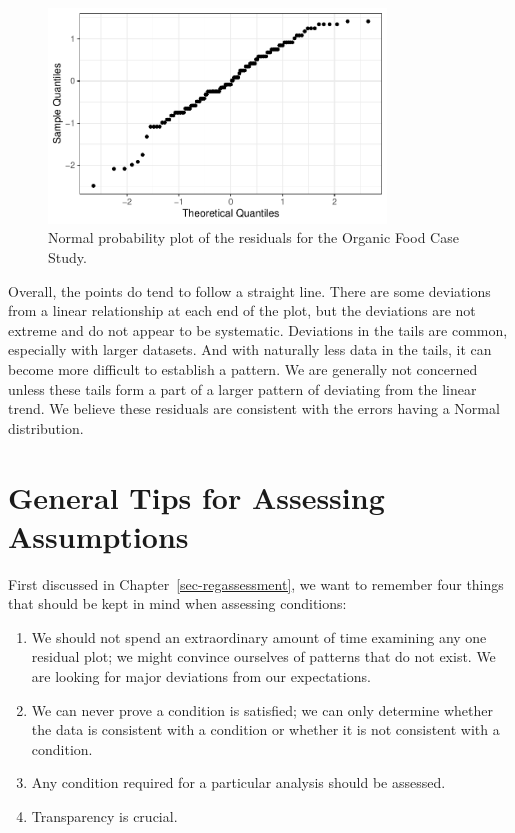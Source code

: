 \documentclass[
  letterpaper,
  DIV=11,
  numbers=noendperiod]{scrreprt}
\providecommand{\tightlist}{%
  \setlength{\itemsep}{0pt}\setlength{\parskip}{0pt}}\usepackage{longtable,booktabs,array}
\theoremstyle{plain}
\theoremstyle{definition}
\theoremstyle{definition}
\theoremstyle{remark}
\begin{document}
\begin{figure}

{\centering \includegraphics[width=0.8\textwidth,height=\textheight]{./images/fig-anovaassessment-normal-organic-1.pdf}

}

\caption{\label{fig-anovaassessment-normal-organic}Normal probability
plot of the residuals for the Organic Food Case Study.}

\end{figure}

Overall, the points do tend to follow a straight line. There are some
deviations from a linear relationship at each end of the plot, but the
deviations are not extreme and do not appear to be systematic.
Deviations in the tails are common, especially with larger datasets. And
with naturally less data in the tails, it can become more difficult to
establish a pattern. We are generally not concerned unless these tails
form a part of a larger pattern of deviating from the linear trend. We
believe these residuals are consistent with the errors having a Normal
distribution.

\hypertarget{general-tips-for-assessing-assumptions-1}{%
\section{General Tips for Assessing
Assumptions}\label{general-tips-for-assessing-assumptions-1}}

First discussed in Chapter~\ref{sec-regassessment}, we want to remember
four things that should be kept in mind when assessing conditions:

\begin{enumerate}
\def\labelenumi{\arabic{enumi}.}
\tightlist
\item
  We should not spend an extraordinary amount of time examining any one
  residual plot; we might convince ourselves of patterns that do not
  exist. We are looking for major deviations from our expectations.
\item
  We can never prove a condition is satisfied; we can only determine
  whether the data is consistent with a condition or whether it is not
  consistent with a condition.
\item
  Any condition required for a particular analysis should be assessed.
\item
  Transparency is crucial.
\end{enumerate}
\end{document}
